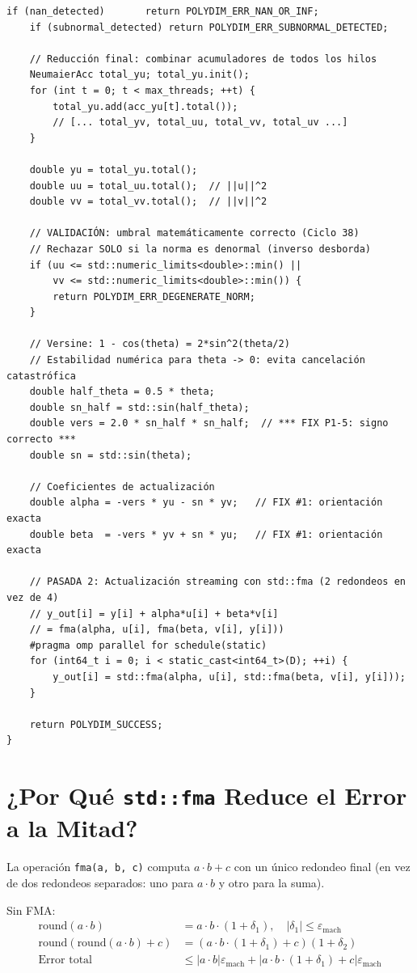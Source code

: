 \begin{lstlisting}[style=cppstyle, caption={Rodrigues Geodésico 2-Pass FMA --- V762}, label=lst:rodrigues_full]
    if (nan_detected)       return POLYDIM_ERR_NAN_OR_INF;
    if (subnormal_detected) return POLYDIM_ERR_SUBNORMAL_DETECTED;

    // Reducción final: combinar acumuladores de todos los hilos
    NeumaierAcc total_yu; total_yu.init();
    for (int t = 0; t < max_threads; ++t) {
        total_yu.add(acc_yu[t].total());
        // [... total_yv, total_uu, total_vv, total_uv ...]
    }

    double yu = total_yu.total();
    double uu = total_uu.total();  // ||u||^2
    double vv = total_vv.total();  // ||v||^2

    // VALIDACIÓN: umbral matemáticamente correcto (Ciclo 38)
    // Rechazar SOLO si la norma es denormal (inverso desborda)
    if (uu <= std::numeric_limits<double>::min() ||
        vv <= std::numeric_limits<double>::min()) {
        return POLYDIM_ERR_DEGENERATE_NORM;
    }

    // Versine: 1 - cos(theta) = 2*sin^2(theta/2)
    // Estabilidad numérica para theta -> 0: evita cancelación catastrófica
    double half_theta = 0.5 * theta;
    double sn_half = std::sin(half_theta);
    double vers = 2.0 * sn_half * sn_half;  // *** FIX P1-5: signo correcto ***
    double sn = std::sin(theta);

    // Coeficientes de actualización
    double alpha = -vers * yu - sn * yv;   // FIX #1: orientación exacta
    double beta  = -vers * yv + sn * yu;   // FIX #1: orientación exacta

    // PASADA 2: Actualización streaming con std::fma (2 redondeos en vez de 4)
    // y_out[i] = y[i] + alpha*u[i] + beta*v[i]
    // = fma(alpha, u[i], fma(beta, v[i], y[i]))
    #pragma omp parallel for schedule(static)
    for (int64_t i = 0; i < static_cast<int64_t>(D); ++i) {
        y_out[i] = std::fma(alpha, u[i], std::fma(beta, v[i], y[i]));
    }

    return POLYDIM_SUCCESS;
}
\end{lstlisting}

\section{¿Por Qué \texttt{std::fma} Reduce el Error a la Mitad?}

La operación \texttt{fma(a, b, c)} computa $a \cdot b + c$ con un único redondeo
final (en vez de dos redondeos separados: uno para $a \cdot b$ y otro para la suma).

Sin FMA:
\begin{align}
\text{round}(a \cdot b) &= a \cdot b \cdot (1 + \delta_1), \quad |\delta_1| \le \varepsilon_{\text{mach}} \\
\text{round}(\text{round}(a \cdot b) + c) &= (a \cdot b \cdot (1 + \delta_1) + c)(1 + \delta_2) \\
\text{Error total} &\le |a \cdot b| \varepsilon_{\text{mach}} + |a \cdot b \cdot (1 + \delta_1) + c| \varepsilon_{\text{mach}}
\end{align}

